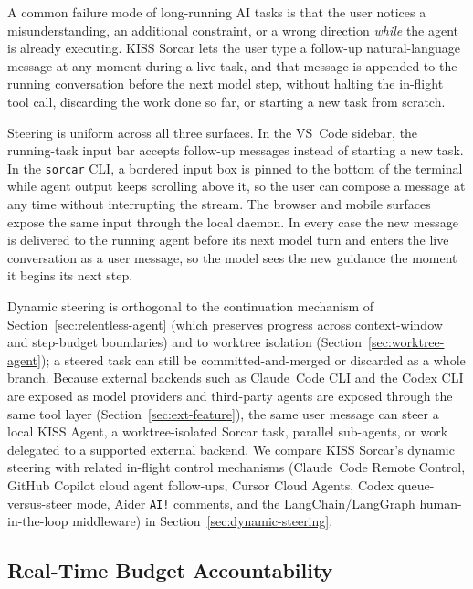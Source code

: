 \documentclass{article}
\begin{document}
A common failure mode of long-running AI tasks is that the user notices a misunderstanding, an additional constraint, or a wrong direction \emph{while} the agent is already executing.  KISS Sorcar lets the user type a follow-up natural-language message at any moment during a live task, and that message is appended to the running conversation before the next model step, without halting the in-flight tool call, discarding the work done so far, or starting a new task from scratch.

Steering is uniform across all three surfaces.  In the VS~Code sidebar, the running-task input bar accepts follow-up messages instead of starting a new task.  In the \texttt{sorcar} CLI, a bordered input box is pinned to the bottom of the terminal while agent output keeps scrolling above it, so the user can compose a message at any time without interrupting the stream.  The browser and mobile surfaces expose the same input through the local daemon.  In every case the new message is delivered to the running agent before its next model turn and enters the live conversation as a user message, so the model sees the new guidance the moment it begins its next step.

Dynamic steering is orthogonal to the continuation mechanism of Section~\ref{sec:relentless-agent} (which preserves progress across context-window and step-budget boundaries) and to worktree isolation (Section~\ref{sec:worktree-agent}); a steered task can still be committed-and-merged or discarded as a whole branch.  Because external backends such as Claude~Code CLI and the Codex CLI are exposed as model providers and third-party agents are exposed through the same tool layer (Section~\ref{sec:ext-feature}), the same user message can steer a local KISS Agent, a worktree-isolated Sorcar task, parallel sub-agents, or work delegated to a supported external backend.  We compare KISS Sorcar's dynamic steering with related in-flight control mechanisms (Claude~Code Remote Control, GitHub Copilot cloud agent follow-ups, Cursor Cloud Agents, Codex queue-versus-steer mode, Aider \texttt{AI!} comments, and the LangChain/LangGraph human-in-the-loop middleware) in Section~\ref{sec:dynamic-steering}.

\subsection{Real-Time Budget Accountability}
\label{sec:budget-feature}
\end{document}

